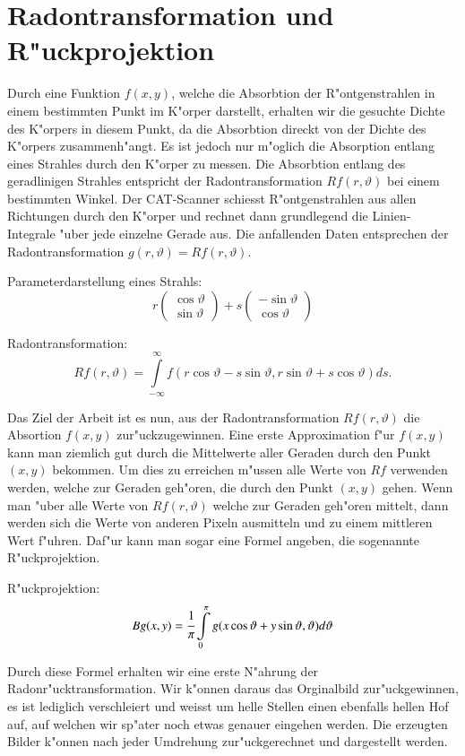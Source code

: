 \section{Radontransformation und R"uckprojektion}

Durch eine Funktion $f(x,y)$, welche die Absorbtion der R"ontgenstrahlen
in einem bestimmten Punkt im K"orper darstellt, erhalten wir die gesuchte
Dichte des K"orpers in diesem Punkt, da die Absorbtion direckt von der
Dichte des K"orpers zusammenh"angt.
Es ist jedoch nur m"oglich die Absorption entlang eines Strahles durch
den K"orper zu messen. Die Absorbtion entlang des geradlinigen Strahles
entspricht der Radontransformation $Rf(r,\vartheta)$ bei einem bestimmten
Winkel.
Der CAT-Scanner schiesst R"ontgenstrahlen aus allen Richtungen durch
den K"orper und rechnet dann grundlegend die Linien-Integrale "uber
jede einzelne Gerade aus. Die anfallenden Daten entsprechen der
Radontransformation $g(r,\vartheta) = Rf(r,\vartheta)$. 

Parameterdarstellung eines Strahls:
\begin{equation}
	r
	\begin{pmatrix}
		\cos{\vartheta} \\ \sin{\vartheta}
	\end{pmatrix}
	+ s
	\begin{pmatrix}
		-\sin{\vartheta} \\ \cos{\vartheta}
	\end{pmatrix}
\end{equation}

Radontransformation:
\begin{equation}
	Rf(r,\vartheta) = \int\limits_{-\infty}^{\infty} f(r\cos{\vartheta}-s\sin{\vartheta},r\sin{\vartheta}+s\cos{\vartheta})ds.
\end{equation}

Das Ziel der Arbeit ist es nun, aus der Radontransformation
$Rf(r,\vartheta)$ die Absortion $f(x,y)$ zur"uckzugewinnen.
Eine erste Approximation f"ur $f(x,y)$ kann man ziemlich gut durch die
Mittelwerte aller Geraden durch den Punkt $(x,y)$ bekommen.
Um dies zu erreichen m"ussen alle Werte von $Rf$ verwenden werden,
welche zur Geraden geh"oren, die durch den Punkt $(x,y)$ gehen. Wenn
man "uber alle Werte von $Rf(r,\vartheta)$ welche zur Geraden geh"oren
mittelt, dann werden sich die Werte von anderen Pixeln ausmitteln und zu
einem mittleren Wert f"uhren. Daf"ur kann man sogar eine Formel angeben,
die sogenannte R"uckprojektion.

R"uckprojektion:
\begin{equation}
	Bg(x,y) = \cfrac{1}{\pi}\int\limits_0^\pi g(x\cos{\vartheta}+y\sin{\vartheta},\vartheta) d\vartheta
\end{equation}

Durch diese Formel erhalten wir eine erste N"ahrung der
Radonr"ucktransformation. Wir k"onnen daraus das Orginalbild
zur"uckgewinnen, es ist lediglich verschleiert und weisst um helle
Stellen einen ebenfalls hellen Hof auf, auf welchen wir sp"ater noch
etwas genauer eingehen werden. Die erzeugten Bilder k"onnen nach jeder
Umdrehung zur"uckgerechnet und dargestellt werden.

